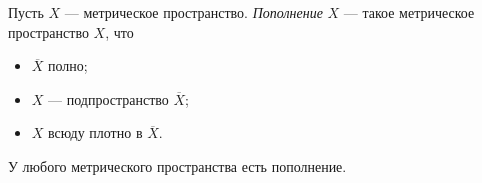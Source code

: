\documentclass[12pt,a4paper]{article}
\begin{document}
    \begin{definition}
        Пусть $X$ --- метрическое пространство. \emph{Пополнение} $X$ --- такое метрическое пространство $X$, что
        \begin{itemize}
            \item $\overline{X}$ полно;
            \item $X$ --- подпространство $\overline{X}$;
            \item $X$ всюду плотно в $\overline{X}$.
        \end{itemize}
    \end{definition}

    \begin{theorem}
        У любого метрического пространства есть пополнение.
    \end{theorem}
\end{document}
